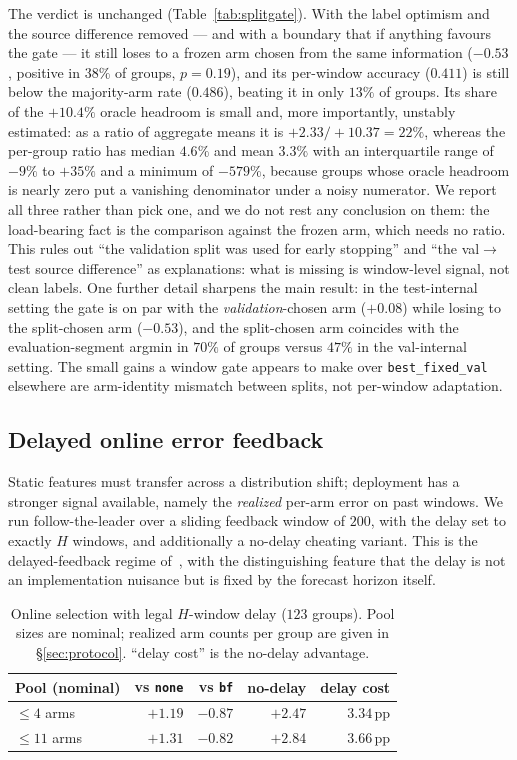 \documentclass[a4paper,fleqn]{cas-sc}
\newcommand{\arm}[1]{\texttt{#1}}
\begin{document}
The verdict is unchanged (Table~\ref{tab:splitgate}). With the label optimism and
the source difference removed --- and with a boundary that if anything favours the
gate --- it still loses to a frozen arm chosen from the same
information ($-0.53$, positive in $38\%$ of groups, $p{=}0.19$), and its
per-window accuracy
($0.411$) is still below the majority-arm rate ($0.486$), beating it in only
$13\%$ of groups. Its share of the $+10.4\%$ oracle headroom is small and, more
importantly, unstably estimated: as a ratio of aggregate means it is
$+2.33/+10.37 = 22\%$, whereas the per-group ratio has median $4.6\%$ and mean
$3.3\%$ with an interquartile range of $-9\%$ to $+35\%$ and a minimum of
$-579\%$, because groups whose oracle headroom is nearly zero put a vanishing
denominator under a noisy numerator. We report all three rather than pick one,
and we do not rest any conclusion on them: the load-bearing fact is the
comparison against the frozen arm, which needs no ratio. This rules out ``the
validation split was used for early
stopping'' and ``the val$\to$test source difference'' as explanations: what is
missing is window-level signal, not clean labels. One further detail sharpens the main
result: in the test-internal setting the gate is on par with the
\emph{validation}-chosen arm ($+0.08$) while losing to the split-chosen arm
($-0.53$), and the split-chosen arm coincides with the evaluation-segment
argmin in $70\%$ of groups versus $47\%$ in the val-internal setting. The small
gains a window gate appears to make over \arm{best\_fixed\_val} elsewhere are
arm-identity mismatch between splits, not per-window adaptation.

\subsection{Delayed online error feedback}
Static features must transfer across a distribution shift; deployment has a
stronger signal available, namely the \emph{realized} per-arm error on past
windows. We run follow-the-leader over a sliding feedback window of $200$,
with the delay set to exactly $H$ windows, and additionally a no-delay cheating
variant. This is the delayed-feedback regime of~\cite{joulani}, with the
distinguishing feature that the delay is not an implementation nuisance but is
fixed by the forecast horizon itself.

\begin{table}[t]
\centering\small
\caption{Online selection with legal $H$-window delay ($123$ groups). Pool sizes
are nominal; realized arm counts per group are given in \S\ref{sec:protocol}.
``delay cost'' is the no-delay advantage.}
\label{tab:online}
\begin{tabular}{lrrrr}
\toprule
Pool (nominal) & vs \arm{none} & vs \arm{bf} & no-delay & delay cost \\
\midrule
$\leq4$ arms  & $+1.19$ & $\mathbf{-0.87}$ & $+2.47$ & $3.34$\,pp \\
$\leq11$ arms & $+1.31$ & $-0.82$ & $+2.84$ & $3.66$\,pp \\
\bottomrule
\end{tabular}
\end{table}
\end{document}
